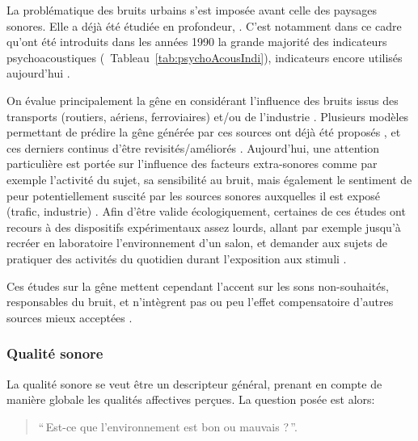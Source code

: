 La problématique des bruits urbains s'est imposée avant celle des paysages sonores. Elle a déjà été étudiée en profondeur, \citep{marquis2005noisea,marquis2005noiseb}. C'est notamment dans ce cadre qu'ont été introduits dans les années 1990 la grande majorité des indicateurs psychoacoustiques \citep{zwicker2013psychoacoustics}(\cf~Tableau~\ref{tab:psychoAcousIndi}), indicateurs encore utilisés aujourd'hui \citep{hall2013exploratory,fiebig2009psychoacoustic,yang2013psychoacoustical}.


On évalue principalement la gêne en considérant l'influence des bruits issus des transports (routiers, aériens, ferroviaires) et/ou de l'industrie  \citep{gille2016noise,gille2016dose,trolle2015perception,klein2015spectral}. Plusieurs modèles permettant de prédire la gêne générée par ces sources ont déjà été proposés \citep{miedema2001annoyance,miedema2004relationship}, et ces derniers continus d'être revisités/améliorés \citep{gille2016testing}. Aujourd'hui, une attention particulière est portée sur l'influence des facteurs extra-sonores comme par exemple l'activité du sujet, sa sensibilité au bruit, mais également le sentiment de peur potentiellement suscité par les sources sonores auxquelles il est exposé (trafic, industrie) \citep{marquis2015simulated,morel2016noise}. Afin d'être valide écologiquement, certaines de ces études ont recours à des dispositifs expérimentaux assez lourds, allant par exemple jusqu'à recréer en laboratoire l'environnement d'un salon, et demander aux sujets de pratiquer des activités du quotidien durant l'exposition aux stimuli \citep{marquis2015simulated}.

Ces études sur la gêne mettent cependant l'accent sur les sons non-souhaités, responsables du bruit, et n'intègrent pas ou peu l'effet compensatoire d'autres sources mieux acceptées \citep{aletta2016soundscape}.

\subsubsection{Qualité sonore}

La qualité sonore se veut être un descripteur général, prenant en compte de manière globale les qualités affectives perçues. La question posée est alors:

\begin{quote}
``\,Est-ce que l'environnement est bon ou mauvais ?\,''.
\end{quote}

